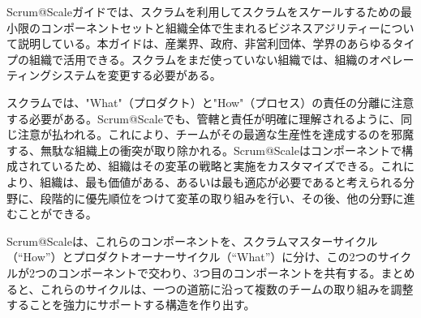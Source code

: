 \documentclass[12pt,a4paper,parskip=full]{scrartcl}
\begin{document}

Scrum@Scaleガイドでは、スクラムを利用してスクラムをスケールするための最小限のコンポーネントセットと組織全体で生まれるビジネスアジリティーについて説明している。本ガイドは、産業界、政府、非営利団体、学界のあらゆるタイプの組織で活用できる。スクラムをまだ使っていない組織では、組織のオペレーティングシステムを変更する必要がある。

スクラムでは、"What"（プロダクト）と"How"（プロセス）の責任の分離に注意する必要がある。Scrum@Scaleでも、管轄と責任が明確に理解されるように、同じ注意が払われる。これにより、チームがその最適な生産性を達成するのを邪魔する、無駄な組織上の衝突が取り除かれる。Scrum@Scaleはコンポーネントで構成されているため、組織はその変革の戦略と実施をカスタマイズできる。これにより、組織は、最も価値がある、あるいは最も適応が必要であると考えられる分野に、段階的に優先順位をつけて変革の取り組みを行い、その後、他の分野に進むことができる。

Scrum@Scaleは、これらのコンポーネントを、スクラムマスターサイクル（“How”）とプロダクトオーナーサイクル（“What”）に分け、この2つのサイクルが2つのコンポーネントで交わり、3つ目のコンポーネントを共有する。まとめると、これらのサイクルは、一つの道筋に沿って複数のチームの取り組みを調整することを強力にサポートする構造を作り出す。
\end{document}
